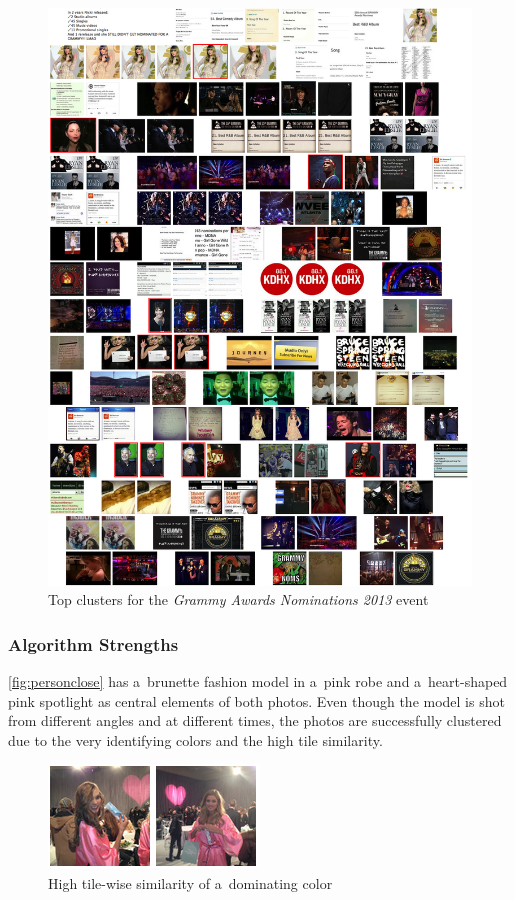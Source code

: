 \begin{figure}[h!]
  \centering
  \includegraphics[width=0.97\linewidth]{./grammy_clusters.png}
  \caption{Top clusters for the \emph{Grammy Awards Nominations 2013} event}
  \label{fig:topgrammy}
\end{figure}

\subsubsection{Algorithm Strengths} 

\autoref{fig:personclose} has a~brunette fashion model in a~pink robe
and a~heart-shaped pink spotlight as central elements of both photos. 
Even though the model is shot from different angles and at different times,
the photos are successfully clustered due to the very identifying colors
and the high tile similarity. 

\begin{figure}[h!]
  \centering
  \includegraphics[width=0.4\linewidth]{./person.png}
  \caption{High tile-wise similarity of a~dominating color}
  \label{fig:personclose}
\end{figure}

